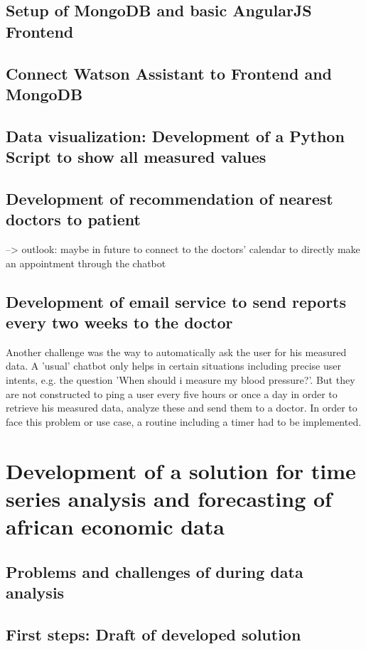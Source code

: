 \section{Setup of MongoDB and basic AngularJS Frontend}

\section{Connect Watson Assistant to Frontend and MongoDB}

\section{Data visualization: Development of a Python Script to show all measured values}

\section{Development of recommendation of nearest doctors to patient}
--> outlook: maybe in future to connect to the doctors' calendar to directly make an appointment through the chatbot

\section{Development of email service to send reports every two weeks to the doctor}

Another challenge was the way to automatically ask the user for his measured data. A 'usual' chatbot only helps in certain situations including precise user intents, e.g. the question 'When should i measure my blood pressure?'. But they are not constructed to ping a user every five hours or once a day in order to retrieve his measured data, analyze these and send them to a doctor. 
In order to face this problem or use case, a routine including a timer had to be implemented.

\chapter{Development of a solution for time series analysis and forecasting of african economic data}\label{development}
\section{Problems and challenges of during data analysis}\label{problems_challenges}

\section{First steps: Draft of developed solution}\label{draft}

